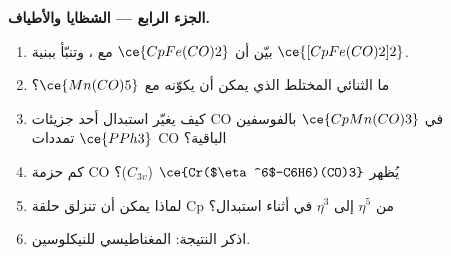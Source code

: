 \begin{problem}
\medskip\noindent\textbf{الجزء الرابع --- الشظايا والأطياف.}
\begin{enumerate}[resume]
  \item بيّن أن $\ce{CpFe(CO)2}$  مع ، وتنبّأ ببنية
        $\ce{[CpFe(CO)2]2}$.
  \item ما الثنائي المختلط الذي يمكن أن يكوّنه مع $\ce{Mn(CO)5}$؟
  \item كيف يغيّر استبدال أحد جزيئات CO في $\ce{CpMn(CO)3}$ بالفوسفين $\ce{PPh3}$ تمددات CO
        الباقية؟
  \item كم حزمة CO يُظهر $\ce{Cr($\eta^6$-C6H6)(CO)3}$ ($C_{3v}$)؟
  \item لماذا يمكن أن تنزلق حلقة Cp من $\eta^5$ إلى $\eta^3$ في أثناء استبدال؟
  \item اذكر النتيجة:  المغناطيسي للنيكلوسين.
\end{enumerate}
\end{problem}
